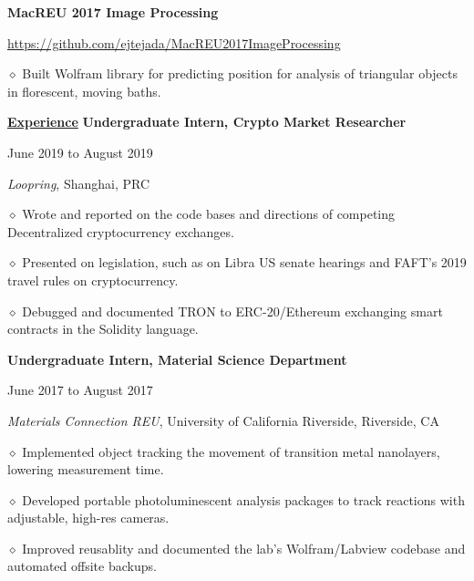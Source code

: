 \documentclass [11pt]{article}
\begin{document}
\begin{flushleft}
\textbf{MacREU 2017 Image Processing}\begin{minipage}{0.71 \linewidth}\begin{flushright}\href{https://github.com/ejtejada/MacREU2017ImageProcessing}{https://github.com/ejtejada/MacREU2017ImageProcessing}\end{flushright}\end{minipage}

‭‭\quad\quad\quad$\diamond$ ‭Built Wolfram library for predicting position for analysis of triangular objects in florescent, moving baths.

\underline{\textbf{Experience}}
\linebreak
\textbf{Undergraduate Intern, Crypto Market Researcher}\begin{minipage}{0.55 \linewidth}\begin{flushright}June 2019 to August 2019\end{flushright}\end{minipage}
\emph{Loopring}, Shanghai, PRC

‭‭\quad\quad\quad$\diamond$ ‭Wrote and reported on the code bases and directions of competing Decentralized cryptocurrency exchanges.

‭‭\quad\quad\quad$\diamond$ Presented on legislation, such as on Libra US senate hearings and FAFT’s 2019 travel rules on cryptocurrency.

‭‭\quad\quad\quad$\diamond$ Debugged and documented TRON to ERC-20/Ethereum exchanging smart contracts in the Solidity language.

\linebreak
\textbf{Undergraduate Intern, Material Science Department}\begin{minipage}{0.535 \linewidth}\begin{flushright}June 2017 to August 2017\end{flushright}\end{minipage}
\emph{Materials Connection REU}, University of California Riverside, Riverside, CA

‭‭\quad\quad\quad$\diamond$ ‭Implemented object tracking the movement of transition metal nanolayers, lowering measurement time.

‭‭\quad\quad\quad$\diamond$ Developed portable photoluminescent analysis packages to track reactions with adjustable, high-res cameras.

‭‭\quad\quad\quad$\diamond$ Improved reusablity and documented the lab’s Wolfram/Labview codebase and automated offsite backups.


\end{flushleft}
\end{document}
